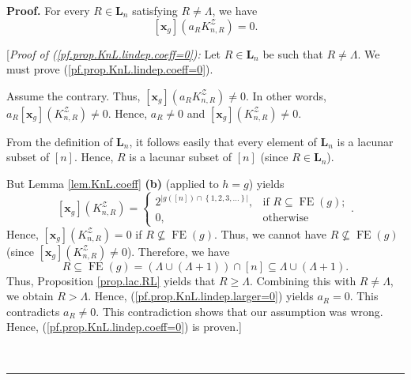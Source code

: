 \documentclass[numbers=enddot,12pt,final,onecolumn,notitlepage]{scrartcl}%
\theoremstyle{definition}
\newenvironment{proof}[1][Proof]{\noindent\textbf{#1.} }{\ \rule{0.5em}{0.5em}}
\newenvironment{vershort}{}{}
\begin{document}
\begin{proof}
For every $R\in\mathbf{L}_{n}$ satisfying $R\neq\Lambda$, we have%
\begin{equation}
\left[  \mathbf{x}_{g}\right]  \left(  a_{R}K_{n,R}^{\mathcal{Z}}\right)  =0.
\label{pf.prop.KnL.lindep.coeff=0}%
\end{equation}


[\textit{Proof of (\ref{pf.prop.KnL.lindep.coeff=0}):} Let $R\in\mathbf{L}%
_{n}$ be such that $R\neq\Lambda$. We must prove
(\ref{pf.prop.KnL.lindep.coeff=0}).

\begin{vershort}
Assume the contrary. Thus, $\left[  \mathbf{x}_{g}\right]  \left(
a_{R}K_{n,R}^{\mathcal{Z}}\right)  \neq0$. In other words, $a_{R}\left[
\mathbf{x}_{g}\right]  \left(  K_{n,R}^{\mathcal{Z}}\right)  \neq0$. Hence,
$a_{R}\neq0$ and $\left[  \mathbf{x}_{g}\right]  \left(  K_{n,R}^{\mathcal{Z}%
}\right)  \neq0$.

From the definition of $\mathbf{L}_{n}$, it follows easily that every element
of $\mathbf{L}_{n}$ is a lacunar subset of $\left[  n\right]  $. Hence, $R$ is
a lacunar subset of $\left[  n\right]  $ (since $R\in\mathbf{L}_{n}$).

But Lemma \ref{lem.KnL.coeff} \textbf{(b)} (applied to $h=g$) yields%
\[
\left[  \mathbf{x}_{g}\right]  \left(  K_{n,R}^{\mathcal{Z}}\right)  =%
\begin{cases}
2^{\left\vert g\left(  \left[  n\right]  \right)  \cap\left\{  1,2,3,\ldots
\right\}  \right\vert }, & \text{if }R\subseteq\operatorname*{FE}\left(
g\right)  ;\\
0, & \text{otherwise}%
\end{cases}
.
\]
Hence, $\left[  \mathbf{x}_{g}\right]  \left(  K_{n,R}^{\mathcal{Z}}\right)
=0$ if $R\not \subseteq \operatorname*{FE}\left(  g\right)  $. Thus, we cannot
have $R\not \subseteq \operatorname*{FE}\left(  g\right)  $ (since $\left[
\mathbf{x}_{g}\right]  \left(  K_{n,R}^{\mathcal{Z}}\right)  \neq0$).
Therefore, we have
\[
R\subseteq\operatorname*{FE}\left(  g\right)  =\left(  \Lambda\cup\left(
\Lambda+1\right)  \right)  \cap\left[  n\right]  \subseteq\Lambda\cup\left(
\Lambda+1\right)  .
\]
Thus, Proposition \ref{prop.lac.RL} yields that $R\geq\Lambda$. Combining this
with $R\neq\Lambda$, we obtain $R>\Lambda$. Hence,
(\ref{pf.prop.KnL.lindep.larger=0}) yields $a_{R}=0$. This contradicts
$a_{R}\neq0$. This contradiction shows that our assumption was wrong. Hence,
(\ref{pf.prop.KnL.lindep.coeff=0}) is proven.]
\end{vershort}


\end{proof}
\end{document}
